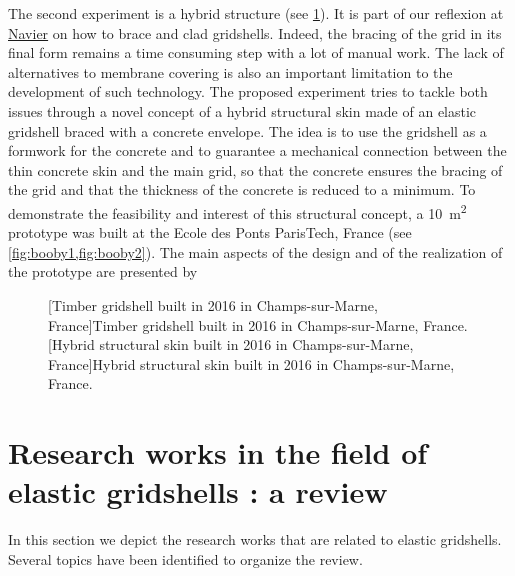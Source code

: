 The second experiment is a hybrid structure (see \cref{fig:booby}). It is part of our reflexion at \href{http://navier.enpc.fr}{Navier} on how to brace and clad gridshells. Indeed, the bracing of the grid in its final form remains a time consuming step with a lot of manual work. The lack of alternatives to membrane covering is also an important limitation to the development of such technology. The proposed experiment tries to tackle both issues through a novel concept of a hybrid structural skin made of an elastic gridshell braced with a concrete envelope. The idea is to use the gridshell as a formwork for the concrete and to guarantee a mechanical connection between the thin concrete skin and the main grid, so that the concrete ensures the bracing of the grid and that the thickness of the concrete is reduced to a minimum. To demonstrate the feasibility and interest of this structural concept, a \SI{10}{m^2} prototype was built at the Ecole des Ponts ParisTech, France (see \cref{fig:booby1,fig:booby2}). The main aspects of the design and of the realization of the prototype are presented by 

\begin{figure}[p]
     	\centering
	\begin{fullpage}
		\hspace*{\fill}
		\vspace{10pt}
		[Timber gridshell built in 2016 in Champs-sur-Marne, France]{Timber gridshell built in 2016 in Champs-sur-Marne, France.}
		\label{fig:clc2016}   
		\vspace{0.5cm}
		\hspace*{\fill}
		\vspace{10pt}
		[Hybrid structural skin built in 2016 in Champs-sur-Marne, France]{Hybrid structural skin built in 2016 in Champs-sur-Marne, France.}
		\label{fig:booby}    
	\end{fullpage}
\end{figure}

\clearpage
\section{Research works in the field of elastic gridshells : a review}\label{sec:review_research}
In this section we depict the research works that are related to elastic gridshells. Several topics have been identified to organize the review.

